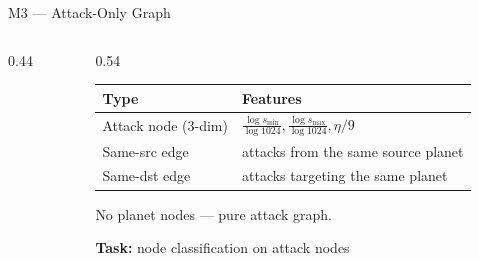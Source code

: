 \documentclass[10pt]{beamer}
\begin{document}
\begin{frame}{M3 — Attack-Only Graph}
\begin{columns}[T]

\begin{column}{0.44\textwidth}
\centering
{}
\end{column}

\begin{column}{0.54\textwidth}
\footnotesize
\begin{tabular}{@{}p{1.9cm}p{3.3cm}@{}}
  \toprule
  Type & Features \\
  \midrule
  Attack node \newline (3-dim) &
    $\tfrac{\log s_{\min}}{\log 1024}$,\,$\tfrac{\log s_{\max}}{\log 1024}$,\,$\eta/9$ \\[4pt]
  Same-src edge & attacks from the same source planet \\[4pt]
  Same-dst edge & attacks targeting the same planet \\
  \bottomrule
\end{tabular}

\vspace{6pt}
No planet nodes — pure attack graph.

\vspace{6pt}
\textbf{Task:} node classification on attack nodes
\end{column}

\end{columns}
\end{frame}
\end{document}
